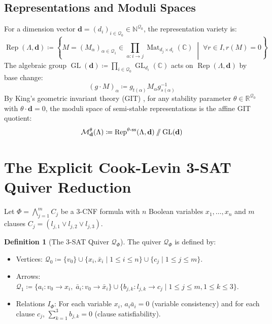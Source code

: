 \documentclass[11pt,a4paper]{article}
\theoremstyle{definition}
\newtheorem{definition}[theorem]{Definition}
\begin{document}
\subsection{Representations and Moduli Spaces}
For a dimension vector $\mathbf{d} = (d_i)_{i \in \mathcal{Q}_0} \in \mathbb{N}^{\mathcal{Q}_0}$, the representation variety is:
\begin{equation}
\operatorname{Rep}(\Lambda, \mathbf{d}) \coloneqq \left\{ M = (M_\alpha)_{\alpha \in \mathcal{Q}_1} \in \prod_{\alpha : i \to j} \operatorname{Mat}_{d_j \times d_i}(\mathbb{C}) \;\middle|\; \forall r \in I, r(M) = 0 \right\}
\end{equation}
The algebraic group $\operatorname{GL}(\mathbf{d}) \coloneqq \prod_{i \in \mathcal{Q}_0} \operatorname{GL}_{d_i}(\mathbb{C})$ acts on $\operatorname{Rep}(\Lambda, \mathbf{d})$ by base change:
\begin{equation}
(g \cdot M)_\alpha \coloneqq g_{t(\alpha)} M_\alpha g_{s(\alpha)}^{-1}
\end{equation}
By King's geometric invariant theory (GIT) \cite{king1994}, for any stability parameter $\theta \in \mathbb{R}^{\mathcal{Q}_0}$ with $\theta \cdot \mathbf{d} = 0$, the moduli space of semi-stable representations is the affine GIT quotient:
\begin{equation}
\mathcal{M}_{\mathbf{d}}^\theta(\Lambda) \coloneqq \operatorname{Rep}^{\theta\text{-ss}}(\Lambda, \mathbf{d}) \mathbin{/\mkern-6mu/} \operatorname{GL}(\mathbf{d})
\end{equation}

\section{The Explicit Cook-Levin 3-SAT Quiver Reduction}
Let $\Phi = \bigwedge_{j=1}^m C_j$ be a 3-CNF formula with $n$ Boolean variables $x_1, \dots, x_n$ and $m$ clauses $C_j = (l_{j,1} \lor l_{j,2} \lor l_{j,3})$.

\begin{definition}[The 3-SAT Quiver $\mathcal{Q}_\Phi$]
The quiver $\mathcal{Q}_\Phi$ is defined by:
\begin{itemize}
    \item Vertices: $\mathcal{Q}_0 \coloneqq \{v_0\} \cup \{x_i, \bar{x}_i \mid 1 \le i \le n\} \cup \{c_j \mid 1 \le j \le m\}$.
    \item Arrows: $\mathcal{Q}_1 \coloneqq \{a_i : v_0 \to x_i, \; \bar{a}_i : v_0 \to \bar{x}_i\} \cup \{b_{j,k} : l_{j,k} \to c_j \mid 1 \le j \le m, 1 \le k \le 3\}$.
    \item Relations $I_\Phi$: For each variable $x_i$, $a_i \bar{a}_i = 0$ (variable consistency) and for each clause $c_j$, $\sum_{k=1}^3 b_{j,k} = 0$ (clause satisfiability).
\end{itemize}
\end{definition}
\end{document}
